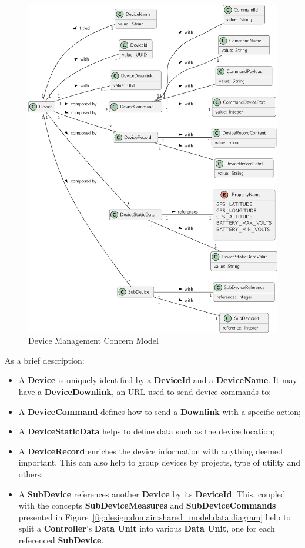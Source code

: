 \begin{figure}[H]
   \centering
  \includegraphics[page=1,width=\columnwidth]{assets/diagrams/design/domain/device-management-model.pdf}
  \caption[Device Management Concern Model]{Device Management Concern Model}
  \label{fig:design:domain:bounded_contexts:device:diagram}
\end{figure}

As a brief description:

\begin{itemize}
   \item A \textbf{Device} is uniquely identified by a \textbf{DeviceId} and a \textbf{DeviceName}. It may have a \textbf{DeviceDownlink}, an URL used to send device commands to;
   \item A \textbf{DeviceCommand} defines how to send a \textbf{Downlink} with a specific action;
   \item A \textbf{DeviceStaticData} helps to define data such as the device location;
   \item A \textbf{DeviceRecord} enriches the device information with anything deemed important. This can also help to group devices by projects, type of utility and others;
   \item A \textbf{SubDevice} references another \textbf{Device} by its \textbf{DeviceId}. This, coupled with the concepts \textbf{SubDeviceMeasures} and \textbf{SubDeviceCommands} presented in Figure~\ref{fig:design:domain:shared_model:data:diagram} help to split a \textbf{Controller}'s \textbf{Data Unit} into various \textbf{Data Unit}, one for each referenced \textbf{SubDevice}.
\end{itemize}

